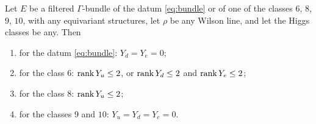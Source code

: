 \begin{theorem}\label{thm:filtered}
Let $E$ be a filtered $\Gamma$-bundle of the datum \eqref{eq:bundle} or of
one of the classes $6$, $8$, $9$, $10$, with any equivariant structures,
let $\rho$ be any Wilson line, and let the Higgs classes be any. Then
\begin{enumerate}[label=\textup{(\roman*)},leftmargin=*,itemsep=1pt]
\item for the datum \eqref{eq:bundle}: $Y_d=Y_e=0$;
\item for the class $6$: $\operatorname{rank} Y_u\le2$, or $\operatorname{rank} Y_d\le2$ and $\operatorname{rank} Y_e\le2$;
\item for the class $8$: $\operatorname{rank} Y_u\le2$;
\item for the classes $9$ and $10$: $Y_u=Y_d=Y_e=0$.
\end{enumerate}
\end{theorem}
